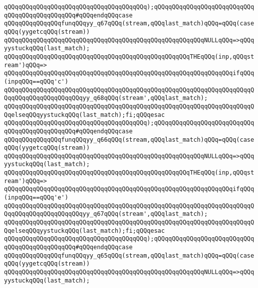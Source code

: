 \verb|qQQqqQQqqQQqqQQqqQQqqQQqqQQqqQQqqQQqqQQq);qQQqqQQqqQQqqQQqqQQqqQQqqQQqqQQqqQQqqQQqqQQqqQQq#qQQqendqQQqcase|\newline
\verb|qQQqqQQqqQQqqQQqfunqQQqyy_q67qQQq(stream,qQQqlast_match)qQQq=qQQq(caseqQQq(yygetcqQQq(stream))|\newline
\verb|qQQqqQQqqQQqqQQqqQQqqQQqqQQqqQQqqQQqqQQqqQQqqQQqqQQqqQQqNULLqQQq=>qQQqyystuckqQQq(last_match);|\newline
\verb|qQQqqQQqqQQqqQQqqQQqqQQqqQQqqQQqqQQqqQQqqQQqqQQqqQQqTHEqQQq(inp,qQQqstream')qQQq=>|\newline
\verb|qQQqqQQqqQQqqQQqqQQqqQQqqQQqqQQqqQQqqQQqqQQqqQQqqQQqqQQqqQQqqQQqifqQQq(inpqQQq==qQQq'c')|\newline
\verb|qQQqqQQqqQQqqQQqqQQqqQQqqQQqqQQqqQQqqQQqqQQqqQQqqQQqqQQqqQQqqQQqqQQqqQQqqQQqqQQqqQQqqQQqqQQqyy_q68qQQq(stream',qQQqlast_match);|\newline
\verb|qQQqqQQqqQQqqQQqqQQqqQQqqQQqqQQqqQQqqQQqqQQqqQQqqQQqqQQqqQQqqQQqqQQqqQQqelseqQQqyystuckqQQq(last_match);fi;qQQqesac|\newline
\verb|qQQqqQQqqQQqqQQqqQQqqQQqqQQqqQQqqQQqqQQq);qQQqqQQqqQQqqQQqqQQqqQQqqQQqqQQqqQQqqQQqqQQqqQQq#qQQqendqQQqcase|\newline
\verb|qQQqqQQqqQQqqQQqfunqQQqyy_q66qQQq(stream,qQQqlast_match)qQQq=qQQq(caseqQQq(yygetcqQQq(stream))|\newline
\verb|qQQqqQQqqQQqqQQqqQQqqQQqqQQqqQQqqQQqqQQqqQQqqQQqqQQqqQQqNULLqQQq=>qQQqyystuckqQQq(last_match);|\newline
\verb|qQQqqQQqqQQqqQQqqQQqqQQqqQQqqQQqqQQqqQQqqQQqqQQqqQQqTHEqQQq(inp,qQQqstream')qQQq=>|\newline
\verb|qQQqqQQqqQQqqQQqqQQqqQQqqQQqqQQqqQQqqQQqqQQqqQQqqQQqqQQqqQQqqQQqifqQQq(inpqQQq==qQQq'e')|\newline
\verb|qQQqqQQqqQQqqQQqqQQqqQQqqQQqqQQqqQQqqQQqqQQqqQQqqQQqqQQqqQQqqQQqqQQqqQQqqQQqqQQqqQQqqQQqqQQqyy_q67qQQq(stream',qQQqlast_match);|\newline
\verb|qQQqqQQqqQQqqQQqqQQqqQQqqQQqqQQqqQQqqQQqqQQqqQQqqQQqqQQqqQQqqQQqqQQqqQQqelseqQQqyystuckqQQq(last_match);fi;qQQqesac|\newline
\verb|qQQqqQQqqQQqqQQqqQQqqQQqqQQqqQQqqQQqqQQq);qQQqqQQqqQQqqQQqqQQqqQQqqQQqqQQqqQQqqQQqqQQqqQQq#qQQqendqQQqcase|\newline
\verb|qQQqqQQqqQQqqQQqfunqQQqyy_q65qQQq(stream,qQQqlast_match)qQQq=qQQq(caseqQQq(yygetcqQQq(stream))|\newline
\verb|qQQqqQQqqQQqqQQqqQQqqQQqqQQqqQQqqQQqqQQqqQQqqQQqqQQqqQQqNULLqQQq=>qQQqyystuckqQQq(last_match);|\newline
